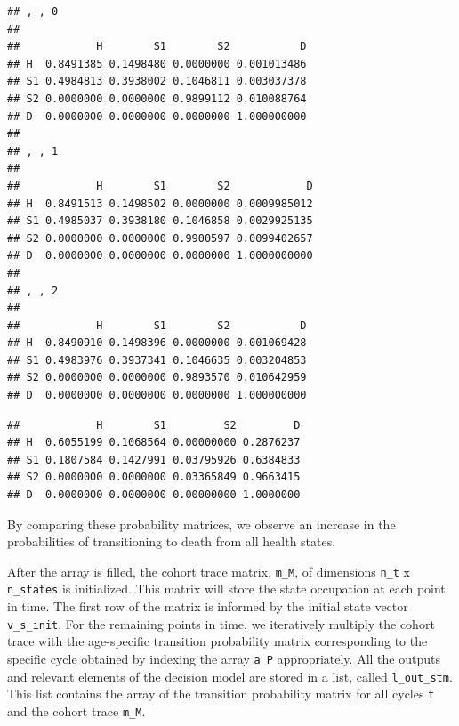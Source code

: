 \documentclass[
]{book}
\newenvironment{Shaded}{\begin{snugshade}}{\end{snugshade}}
\newcommand{\CommentTok}[1]{\textcolor[rgb]{0.56,0.35,0.01}{\textit{#1}}}
\newcommand{\DecValTok}[1]{\textcolor[rgb]{0.00,0.00,0.81}{#1}}
\newcommand{\NormalTok}[1]{#1}
\newcommand{\SpecialCharTok}[1]{\textcolor[rgb]{0.81,0.36,0.00}{\textbf{#1}}}
\begin{document}
\begin{Shaded}
\end{Shaded}

\begin{verbatim}
## , , 0
## 
##            H        S1        S2           D
## H  0.8491385 0.1498480 0.0000000 0.001013486
## S1 0.4984813 0.3938002 0.1046811 0.003037378
## S2 0.0000000 0.0000000 0.9899112 0.010088764
## D  0.0000000 0.0000000 0.0000000 1.000000000
## 
## , , 1
## 
##            H        S1        S2            D
## H  0.8491513 0.1498502 0.0000000 0.0009985012
## S1 0.4985037 0.3938180 0.1046858 0.0029925135
## S2 0.0000000 0.0000000 0.9900597 0.0099402657
## D  0.0000000 0.0000000 0.0000000 1.0000000000
## 
## , , 2
## 
##            H        S1        S2           D
## H  0.8490910 0.1498396 0.0000000 0.001069428
## S1 0.4983976 0.3937341 0.1046635 0.003204853
## S2 0.0000000 0.0000000 0.9893570 0.010642959
## D  0.0000000 0.0000000 0.0000000 1.000000000
\end{verbatim}

\begin{Shaded}
\end{Shaded}

\begin{verbatim}
##            H        S1         S2         D
## H  0.6055199 0.1068564 0.00000000 0.2876237
## S1 0.1807584 0.1427991 0.03795926 0.6384833
## S2 0.0000000 0.0000000 0.03365849 0.9663415
## D  0.0000000 0.0000000 0.00000000 1.0000000
\end{verbatim}

By comparing these probability matrices, we observe an increase in the probabilities of transitioning to death from all health states.

After the array is filled, the cohort trace matrix, \texttt{m\_M}, of dimensions \texttt{n\_t} x \texttt{n\_states} is initialized. This matrix will store the state occupation at each point in time. The first row of the matrix is informed by the initial state vector \texttt{v\_s\_init}. For the remaining points in time, we iteratively multiply the cohort trace with the age-specific transition probability matrix corresponding to the specific cycle obtained by indexing the array \texttt{a\_P} appropriately. All the outputs and relevant elements of the decision model are stored in a list, called \texttt{l\_out\_stm}. This list contains the array of the transition probability matrix for all cycles \texttt{t} and the cohort trace \texttt{m\_M}.
\end{document}
